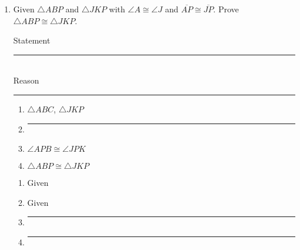 \documentclass[12pt, oneside]{article}
\begin{document}
\begin{enumerate}
  \item Given $\triangle ABP$ and $\triangle JKP$ with $\angle A \cong \angle J$ and $\overline{AP} \cong \overline{JP}$. Prove $\triangle ABP \cong \triangle JKP$.\\[0.5cm]
    \begin{multicols}{2}
      Statement \\ \rule{2.5cm}{0.15mm}\\
      Reason \\ \rule{2.5cm}{0.15mm}
    \end{multicols}
    \begin{multicols}{2}
      \begin{enumerate}
        \item $\triangle ABC$, $\triangle JKP$ \vspace{0.4cm}
        \item \rule{4cm}{0.15mm}%
        \item $\angle APB \cong \angle JPK$ %
        \vspace{0.4cm}
        \item $\triangle ABP \cong \triangle JKP$
      \end{enumerate}
      \begin{enumerate}
        \item Given
        \item Given
        \item \rule{4cm}{0.15mm}
        \item \rule{4cm}{0.15mm}
      \end{enumerate}
    \end{multicols}


\end{enumerate}
\end{document}
